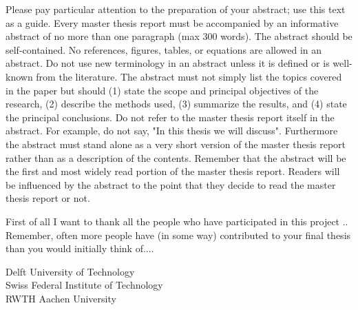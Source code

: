 \documentclass[a4paper,11pt]{MScThesis}
\begin{document}
%
\frontmatter %
%
    \maketitle
%

Please pay particular attention to the preparation of your abstract; use this text as a guide. Every master thesis report must be accompanied by an informative abstract of no more than one paragraph (max 300 words). The abstract should be self-contained. No references, figures, tables, or equations are allowed in an abstract. Do not use new terminology in an abstract unless it is defined or is well-known from the literature. The abstract must not simply list the topics covered in the paper but should (1) state the scope and principal objectives of the research, (2) describe the methods used, (3) summarize the results, and (4) state the principal conclusions. Do not refer to the master thesis report itself in the abstract. For example, do not say, "In this thesis we will discuss". Furthermore the abstract must stand alone as a very short version of the master thesis report rather than as a description of the contents. Remember that the abstract will be the first and most widely read portion of the master thesis report. Readers will be influenced by the abstract to the point that they decide to read the master thesis report or not.

    \cleardoublepage
%
    First of all I want to thank all the people who have participated in this project ..
    Remember, often more people have (in some way) contributed to your final thesis than you would initially think of....
    \vspace*{15mm}

    \noindent
    Delft University of Technology \hfill \mscname\\ %
    Swiss Federal Institute of Technology \hfill \mscname\\ %
    RWTH Aachen University \hfill \mscname\\ %
    \mscdate

%
    \tocloflot
%
    \printnomencl %
%
    \begin{acronym}%
    \end{acronym}%
    \cleardoublepage%
%
%
%
\mainmatter
%
\end{document}
